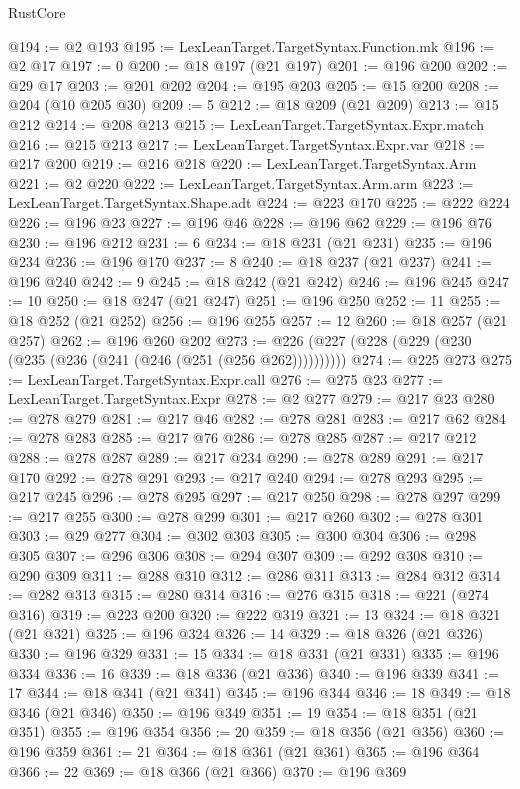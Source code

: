 \begin{lexlean}{RustCore}
\begin{coremodule}
@194 := @2 @193
@195 := LexLeanTarget.TargetSyntax.Function.mk
@196 := @2 @17
@197 := 0
@200 := @18 @197 (@21 @197)
@201 := @196 @200
@202 := @29 @17
@203 := @201 @202
@204 := @195 @203
@205 := @15 @200
@208 := @204 (@10 @205 @30)
@209 := 5
@212 := @18 @209 (@21 @209)
@213 := @15 @212
@214 := @208 @213
@215 := LexLeanTarget.TargetSyntax.Expr.match
@216 := @215 @213
@217 := LexLeanTarget.TargetSyntax.Expr.var
@218 := @217 @200
@219 := @216 @218
@220 := LexLeanTarget.TargetSyntax.Arm
@221 := @2 @220
@222 := LexLeanTarget.TargetSyntax.Arm.arm
@223 := LexLeanTarget.TargetSyntax.Shape.adt
@224 := @223 @170
@225 := @222 @224
@226 := @196 @23
@227 := @196 @46
@228 := @196 @62
@229 := @196 @76
@230 := @196 @212
@231 := 6
@234 := @18 @231 (@21 @231)
@235 := @196 @234
@236 := @196 @170
@237 := 8
@240 := @18 @237 (@21 @237)
@241 := @196 @240
@242 := 9
@245 := @18 @242 (@21 @242)
@246 := @196 @245
@247 := 10
@250 := @18 @247 (@21 @247)
@251 := @196 @250
@252 := 11
@255 := @18 @252 (@21 @252)
@256 := @196 @255
@257 := 12
@260 := @18 @257 (@21 @257)
@262 := @196 @260 @202
@273 := @226 (@227 (@228 (@229 (@230 (@235 (@236 (@241 (@246 (@251 (@256 @262))))))))))
@274 := @225 @273
@275 := LexLeanTarget.TargetSyntax.Expr.call
@276 := @275 @23
@277 := LexLeanTarget.TargetSyntax.Expr
@278 := @2 @277
@279 := @217 @23
@280 := @278 @279
@281 := @217 @46
@282 := @278 @281
@283 := @217 @62
@284 := @278 @283
@285 := @217 @76
@286 := @278 @285
@287 := @217 @212
@288 := @278 @287
@289 := @217 @234
@290 := @278 @289
@291 := @217 @170
@292 := @278 @291
@293 := @217 @240
@294 := @278 @293
@295 := @217 @245
@296 := @278 @295
@297 := @217 @250
@298 := @278 @297
@299 := @217 @255
@300 := @278 @299
@301 := @217 @260
@302 := @278 @301
@303 := @29 @277
@304 := @302 @303
@305 := @300 @304
@306 := @298 @305
@307 := @296 @306
@308 := @294 @307
@309 := @292 @308
@310 := @290 @309
@311 := @288 @310
@312 := @286 @311
@313 := @284 @312
@314 := @282 @313
@315 := @280 @314
@316 := @276 @315
@318 := @221 (@274 @316)
@319 := @223 @200
@320 := @222 @319
@321 := 13
@324 := @18 @321 (@21 @321)
@325 := @196 @324
@326 := 14
@329 := @18 @326 (@21 @326)
@330 := @196 @329
@331 := 15
@334 := @18 @331 (@21 @331)
@335 := @196 @334
@336 := 16
@339 := @18 @336 (@21 @336)
@340 := @196 @339
@341 := 17
@344 := @18 @341 (@21 @341)
@345 := @196 @344
@346 := 18
@349 := @18 @346 (@21 @346)
@350 := @196 @349
@351 := 19
@354 := @18 @351 (@21 @351)
@355 := @196 @354
@356 := 20
@359 := @18 @356 (@21 @356)
@360 := @196 @359
@361 := 21
@364 := @18 @361 (@21 @361)
@365 := @196 @364
@366 := 22
@369 := @18 @366 (@21 @366)
@370 := @196 @369

\end{coremodule}
\end{lexlean}
